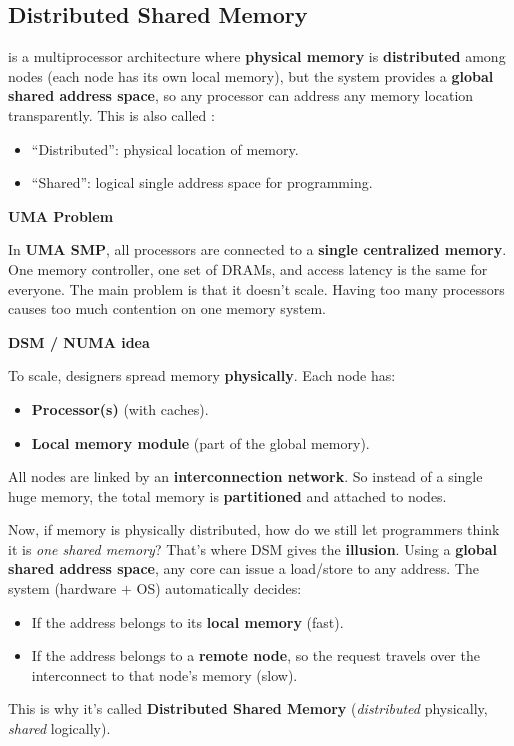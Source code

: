 \subsection{Distributed Shared Memory}

 is a multiprocessor architecture where \textbf{physical memory} is \textbf{distributed} among nodes (each node has its own local memory), but the system provides a \textbf{global shared address space}, so any processor can address any memory location transparently. This is also called :
\begin{itemize}
    \item ``Distributed'': physical location of memory.
    \item ``Shared'': logical single address space for programming.
\end{itemize}

\highspace
\begin{flushleft}
    \textcolor{Red2}{ \textbf{UMA Problem}}
\end{flushleft}
In \textbf{UMA SMP}, all processors are connected to a \textbf{single centralized memory}. One memory controller, one set of DRAMs, and access latency is the same for everyone. The main problem is that it doesn't scale. Having too many processors causes too much contention on one memory system.

\highspace
\begin{flushleft}
    \textcolor{Green3}{ \textbf{DSM / NUMA idea}}
\end{flushleft}
To scale, designers spread memory \textbf{physically}. Each node has:
\begin{itemize}
    \item \textbf{Processor(s)} (with caches).
    \item \textbf{Local memory module} (part of the global memory).
\end{itemize}
All nodes are linked by an \textbf{interconnection network}. So instead of a single huge memory, the total memory is \textbf{partitioned} and attached to nodes.

\highspace
Now, if memory is physically distributed, how do we still let programmers think it is \emph{one shared memory}? That's where DSM gives the \textbf{illusion}. Using a \textbf{global shared address space}, any core can issue a load/store to any address. The system (hardware $+$ OS) automatically decides:
\begin{itemize}
    \item If the address belongs to its \textbf{local memory} (fast).
    \item If the address belongs to a \textbf{remote node}, so the request travels over the interconnect to that node's memory (slow).
\end{itemize}
This is why it's called \textbf{Distributed Shared Memory} (\emph{distributed} physically, \emph{shared} logically).


